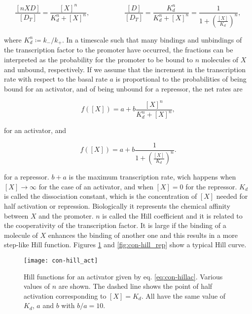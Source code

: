 \begin{equation*}
  \frac{[nXD]}{[D_T]} = \frac{[X]^n}{K_d^n+[X]^n}, \quad\quad\quad\quad\quad  \frac{[D]}{[D_T]} = \frac{K_d^n}{K_d^n+[X]^n} = \frac{1}{1+\left(\frac{[X]}{K_d}\right)^n},
\end{equation*}

where $K_d^n \coloneqq k_-/k_+$. In a timescale such that many bindings and unbindings of the transcription factor to the promoter have occurred, the fractions can be interpreted as the probability for the promoter to be bound to $n$ molecules of $X$ and unbound, respectively. If we assume that the increment in the transcription rate with respect to the basal rate $a$ is proportional to the probabilities of being bound for an activator, and of being unbound for a repressor, the net rates are

\begin{equation}
  \label{eq:con-hillac}
  f([X]) = a + b \frac{[X]^n}{K_d^n+[X]^n},
\end{equation}

for an activator, and

\begin{equation}
  \label{eq:con-hillrep}
  f([X]) = a + b \frac{1}{1+\left(\frac{[X]}{K_d}\right)^n}.
\end{equation}

for a repressor. $b+a$ is the maximum transcription rate, wich happens when $[X]\rightarrow\infty$ for the case of an activator, and when $[X]=0$ for the repressor. $K_d$ is called the dissociation constant, which is the concentration of $[X]$ needed for half activation or repression. Biologically it represents the chemical affinity between $X$ and the promoter. $n$ is called the Hill coefficient and it is related to the cooperativity of the transcription factor. It is large if the binding of a molecule of $X$ enhances the binding of another one and this results in a more step-like Hill function. Figures \ref{fig:con-hill_act} and \ref{fig:con-hill_rep} show a typical Hill curve.

\begin{figure}[H]
  \centering
  \texttt{[image: con-hill\_act]}
  \caption[Hill functions for an activator]{\label{fig:con-hill_act} Hill functions for an activator given by eq. \eqref{eq:con-hillac}. Various values of $n$ are shown. The dashed line shows the point of half activation corresponding to $[X]=K_d$. All have the same value of $K_d$, $a$ and $b$ with $b/a=10$.}
\end{figure}

